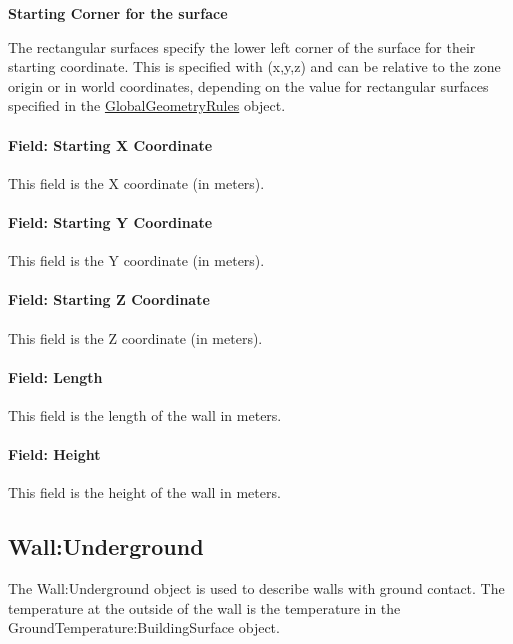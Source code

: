 \begin{callout}
\textbf{Starting Corner for the surface}

The rectangular surfaces specify the lower left corner of the surface for their starting coordinate. This is specified with (x,y,z) and can be relative to the zone origin or in world coordinates, depending on the value for rectangular surfaces specified in the \hyperref[globalgeometryrules]{GlobalGeometryRules} object.
\end{callout}

\paragraph{Field: Starting X Coordinate}\label{field-starting-x-coordinate-1}

This field is the X coordinate (in meters).

\paragraph{Field: Starting Y Coordinate}\label{field-starting-y-coordinate-1}

This field is the Y coordinate (in meters).

\paragraph{Field: Starting Z Coordinate}\label{field-starting-z-coordinate-1}

This field is the Z coordinate (in meters).

\paragraph{Field: Length}\label{field-length-1}

This field is the length of the wall in meters.

\paragraph{Field: Height}\label{field-height-1}

This field is the height of the wall in meters.

\subsection{Wall:Underground}\label{wallunderground}

The Wall:Underground object is used to describe walls with ground contact. The temperature at the outside of the wall is the temperature in the GroundTemperature:BuildingSurface object.


